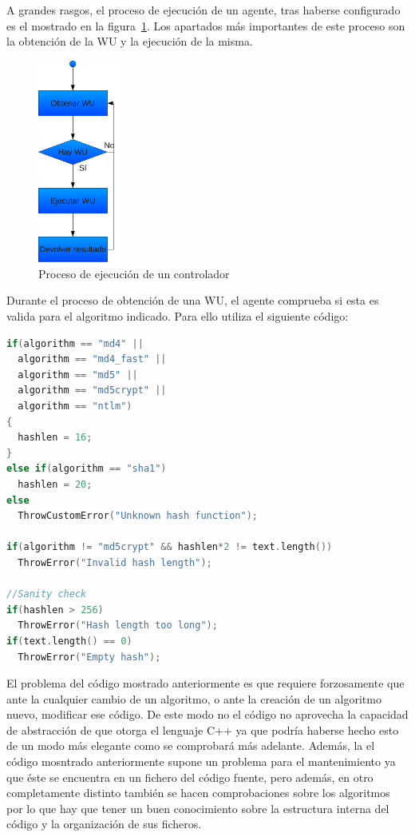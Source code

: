 A grandes rasgos, el proceso de ejecución de un agente, tras haberse configurado es el mostrado en la figura~\ref{fig:cont_proc_ejec}. Los apartados más importantes de este proceso son la obtención de la WU y la ejecución de la misma.

\begin{figure}
	\centering
	\includegraphics[width=0.26\textwidth]{images/proc_cont.pdf}
	\caption{Proceso de ejecución de un controlador}\label{fig:cont_proc_ejec}
\end{figure}

Durante el proceso de obtención de una WU, el agente comprueba si esta es valida para el algoritmo indicado. Para ello utiliza el siguiente código:

\begin{lstlisting}[language=c]
if(algorithm == "md4" || 
  algorithm == "md4_fast" || 
  algorithm == "md5" ||
  algorithm == "md5crypt" ||
  algorithm == "ntlm")
{
  hashlen = 16;
}
else if(algorithm == "sha1")
  hashlen = 20;
else        
  ThrowCustomError("Unknown hash function");
                
if(algorithm != "md5crypt" && hashlen*2 != text.length())
  ThrowError("Invalid hash length");

//Sanity check
if(hashlen > 256)
  ThrowError("Hash length too long");
if(text.length() == 0)
  ThrowError("Empty hash");
\end{lstlisting}

El problema del código mostrado anteriormente es que requiere forzosamente que ante la cualquier cambio de un algoritmo, o ante la creación de un algoritmo nuevo, modificar ese código. De este modo no el código no aprovecha la capacidad de abstracción de que otorga el lenguaje C++ ya que podría haberse hecho esto de un modo más elegante como se comprobará más adelante. Además, la el código mosntrado anteriormente supone un problema para el mantenimiento ya que éste se encuentra en un fichero del código fuente, pero además, en otro completamente distinto también se hacen comprobaciones sobre los algoritmos por lo que hay que tener un buen conocimiento sobre la estructura interna del código y la organización de sus ficheros.

